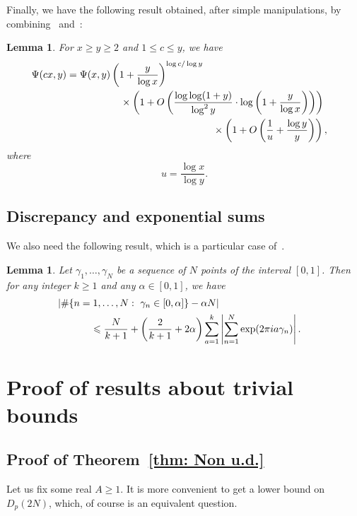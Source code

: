 \documentclass[12pt]{amsart}
\newtheorem{lemma}[theorem]{Lemma}
\numberwithin{equation}{section}
\numberwithin{theorem}{section}
\numberwithin{table}{section}
\numberwithin{figure}{section}
\def\le{\leqslant}
\def\leq{\leqslant}
\def\ge{\geqslant}
\def\leq{\leqslant}
\def\\{\cr}
\def\({\left(}
\def\){\right)}
\begin{document}
Finally,  we have the following result obtained, after simple manipulations, by combining~\cite[Theorem~3]{HilTen1} 
and~\cite[Equation~(2.4)]{HilTen1}:

\begin{lemma}
\label{lem:psicxHildebrand}
For $x\geq y\geq 2$ and $1\leq c\leq y$, we have  
\begin{align*}
    \Psi(cx, y)=\Psi(x, y)& \left(1+\frac{y}{\log x}\right)^{\log c/\log y}\\
    &  \quad \times \left(1+O\left(\frac{\log\log(1+y)}{\log^2 y}\cdot\log\left(1+\frac{y}{\log x}\right)\right)\right)\\
    & \qquad  \qquad \qquad    \qquad \qquad  \ \times \left(1+O\left(\frac{1}{u}+\frac{\log y}{y}\right)\right), 
\end{align*}
where
$$
u= \frac{\log x}{\log y}.
$$ 
\end{lemma} 


 
 \subsection{Discrepancy and exponential sums}
 We also need the
following result, which is a particular case of~\cite[Chapter~1,
Theorem~1]{Mont}.

\begin{lemma}
\label{lem:Mont} Let $\gamma_1, \ldots, \gamma_N$ be a sequence
of $N$ points of the interval $[0,1]$. Then for any integer
$k\ge 1$ and any  $\alpha\in [0,1]$, we
have
\begin{align*}
\left|\# \{n =1, \ldots, N:~\gamma_n  \in [0, \alpha]\} - \alpha N 
\right| &\\
\le \frac{N}{k+1} +  \(\frac{2}{k+1}+2\alpha\) \sum_{a=1}^k &
\left|\sum_{n=1}^N \exp(2 \pi i a \gamma_n)\right|.
\end{align*}
\end{lemma}


\section{Proof of  results about trivial bounds}

\subsection{Proof of  Theorem~\ref{thm: Non u.d.}} 
Let us fix some real  $A\ge 1$. It is more convenient to get a lower bound on  $D_p(2N)$, 
which,  of course is an equivalent question.
 
\end{document}
